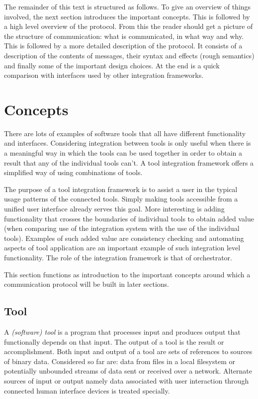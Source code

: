 \documentclass{article}
\begin{document}
  The remainder of this text is structured as follows. To give an overview of
  things involved, the next section introduces the important concepts. This is
  followed by a high level overview of the protocol. From this the reader
  should get a picture of the structure of communication: what is communicated,
  in what way and why. This is followed by a more detailed description of the
  protocol. It consists of a description of the contents of messages, their
  syntax and effects (rough semantics) and finally some of the important design
  choices.  At the end is a quick comparison with interfaces used by other
  integration frameworks.

 \section{Concepts}

   There are lots of examples of software tools that all have different
   functionality and interfaces. Considering integration between tools is only
   useful when there is a meaningful way in which the tools can be used
   together in order to obtain a result that any of the individual tools can't.
   A tool integration framework offers a simplified way of using combinations
   of tools.
 
   The purpose of a tool integration framework is to assist a user in the
   typical usage patterns of the connected tools. Simply making tools
   accessible from a unified user interface already serves this goal. More
   interesting is adding functionality that crosses the boundaries of
   individual tools to obtain added value (when comparing use of the
   integration system with the use of the individual tools). Examples of such
   added value are consistency checking and automating aspects of tool
   application are an important example of such integration level
   functionality. The role of the integration framework is that of
   orchestrator.

   This section functions as introduction to the important concepts around
   which a communication protocol will be built in later sections.

  \subsection{Tool}

   A \textit{(software) tool} is a program that processes input and produces
   output that functionally depends on that input. The output of a tool is the
   result or accomplishment. Both input and output of a tool are sets of
   references to sources of binary data. Considered so far are: data from files
   in a local filesystem or potentially unbounded streams of data sent or received
   over a network. Alternate sources of input or output namely data associated
   with user interaction through connected human interface devices is treated
   specially.
   
\end{document}
